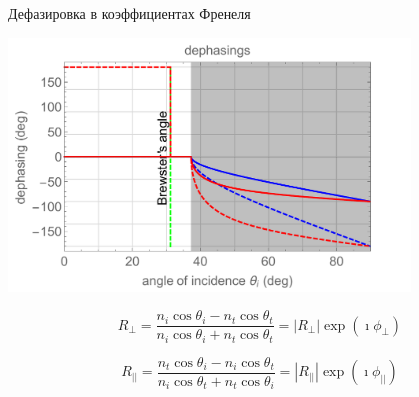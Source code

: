 \documentclass[9pt, compress, xcolor=table]{beamer}
\begin{document}
\begin{frame}{Дефазировка в коэффициентах Френеля}

\begin{center}
\includegraphics[width=0.8\textwidth]{fresnel}
\end{center}

\begin{equation*}
R_{\perp} =\frac{n_i\cos\theta_i-n_t\cos\theta_t}{n_i\cos\theta_i+n_t\cos\theta_t}=|R_{\perp}|\exp(\imath\phi_{\perp})
\end{equation*}

\begin{equation*}
R_{||} =\frac{n_t\cos\theta_i-n_i\cos\theta_t}{n_i\cos\theta_t+n_t\cos\theta_i}=|R_{||}|\exp(\imath\phi_{||})
\end{equation*}

\end{frame}
\end{document}
